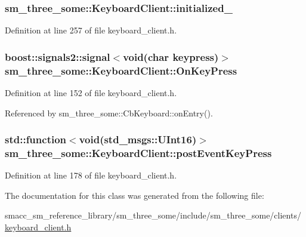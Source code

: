 \subsubsection[{\texorpdfstring{initialized\+\_\+}{initialized_}}]{ sm\+\_\+three\+\_\+some\+::\+Keyboard\+Client\+::initialized\+\_\+\hspace{0.3cm}{\ttfamily [private]}}\hypertarget{classsm__three__some_1_1KeyboardClient_ab374495b4e0587afa6f09da97f4df615}{}\label{classsm__three__some_1_1KeyboardClient_ab374495b4e0587afa6f09da97f4df615}


Definition at line 257 of file keyboard\+\_\+client.\+h.

\subsubsection[{\texorpdfstring{On\+Key\+Press}{OnKeyPress}}]{\setlength{\rightskip}{0pt plus 5cm}boost\+::signals2\+::signal$<$void(char keypress)$>$ sm\+\_\+three\+\_\+some\+::\+Keyboard\+Client\+::\+On\+Key\+Press}\hypertarget{classsm__three__some_1_1KeyboardClient_a96b6b8220c64a1e33480d5ac75c3b8e0}{}\label{classsm__three__some_1_1KeyboardClient_a96b6b8220c64a1e33480d5ac75c3b8e0}


Definition at line 152 of file keyboard\+\_\+client.\+h.



Referenced by sm\+\_\+three\+\_\+some\+::\+Cb\+Keyboard\+::on\+Entry().

\subsubsection[{\texorpdfstring{post\+Event\+Key\+Press}{postEventKeyPress}}]{\setlength{\rightskip}{0pt plus 5cm}std\+::function$<$void(std\+\_\+msgs\+::\+U\+Int16)$>$ sm\+\_\+three\+\_\+some\+::\+Keyboard\+Client\+::post\+Event\+Key\+Press}\hypertarget{classsm__three__some_1_1KeyboardClient_a6f2eb3f03eb4083abe101823910fcda4}{}\label{classsm__three__some_1_1KeyboardClient_a6f2eb3f03eb4083abe101823910fcda4}


Definition at line 178 of file keyboard\+\_\+client.\+h.



The documentation for this class was generated from the following file\+:\begin{DoxyCompactItemize}
\item 
smacc\+\_\+sm\+\_\+reference\+\_\+library/sm\+\_\+three\+\_\+some/include/sm\+\_\+three\+\_\+some/clients/\hyperlink{keyboard__client_8h}{keyboard\+\_\+client.\+h}\end{DoxyCompactItemize}
